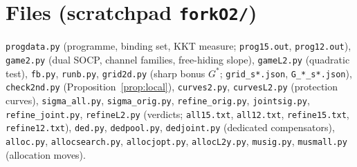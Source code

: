 \documentclass[11pt]{article}
\theoremstyle{definition}
\begin{document}
\section*{Files (scratchpad \texttt{forkO2/})}
\texttt{progdata.py} (programme, binding set, KKT measure; \texttt{prog15.out}, \texttt{prog12.out}),
\texttt{game2.py} (dual SOCP, channel families, free-hiding slope), \texttt{gameL2.py} (quadratic test),
\texttt{fb.py}, \texttt{runb.py}, \texttt{grid2d.py} (sharp bonus $G^*$; \texttt{grid\_s*.json}, \texttt{G\_*\_s*.json}),
\texttt{check2nd.py} (Proposition~\ref{prop:local}), \texttt{curves2.py}, \texttt{curvesL2.py} (protection curves),
\texttt{sigma\_all.py}, \texttt{sigma\_orig.py}, \texttt{refine\_orig.py}, \texttt{jointsig.py}, \texttt{refine\_joint.py}, \texttt{refineL2.py} (verdicts;
\texttt{all15.txt}, \texttt{all12.txt}, \texttt{refine15.txt}, \texttt{refine12.txt}),
\texttt{ded.py}, \texttt{dedpool.py}, \texttt{dedjoint.py} (dedicated compensators), \texttt{alloc.py}, \texttt{allocsearch.py}, \texttt{allocjopt.py},
\texttt{allocL2y.py}, \texttt{musig.py}, \texttt{musmall.py} (allocation moves).
\end{document}
